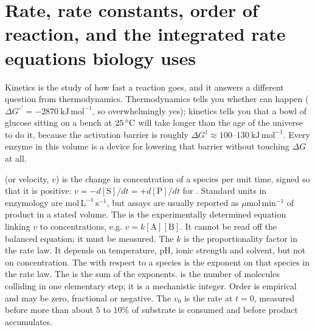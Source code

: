 
\section{Rate, rate constants, order of reaction, and the integrated rate equations biology uses}

Kinetics is the study of how fast a reaction goes, and it answers a different question
from thermodynamics. Thermodynamics tells you whether 
can happen ($\Delta G^{\circ\prime} = -2870\ \mathrm{kJ\,mol^{-1}}$, so overwhelmingly yes);
kinetics tells you that a bowl of glucose sitting on a bench at $25\,^{\circ}\mathrm{C}$ will take
longer than the age of the universe to do it, because the activation barrier is roughly
$\Delta G^{\ddagger} \approx 100\text{--}130\ \mathrm{kJ\,mol^{-1}}$. Every enzyme in
this volume is a device for lowering that barrier without touching $\Delta G$ at all.

\begin{defbox}[title={DEFINITIONS: the vocabulary of rate}]
 (or velocity, $v$) is the change in concentration of a species per unit time,
signed so that it is positive: $v=-d[\mathrm{S}]/dt=+d[\mathrm{P}]/dt$ for
. Standard units in enzymology are
$\mathrm{mol\,L^{-1}\,s^{-1}}$, but assays are usually reported as
$\mu\mathrm{mol\,min^{-1}}$ of product in a stated volume.
The  is the experimentally determined equation linking $v$ to
concentrations, e.g. $v=k[\mathrm{A}][\mathrm{B}]$. It cannot be read off the balanced
equation; it must be measured.
The  $k$ is the proportionality factor in the rate law. It depends on
temperature, pH, ionic strength and solvent, but not on concentration.
The  with respect to a species is the exponent on that species in the rate
law. The  is the sum of the exponents.
 is the number of molecules colliding in one elementary step; it is a
mechanistic integer. Order is empirical and may be zero, fractional or negative.
The  $v_0$ is the rate at $t=0$, measured before more than about
$5$ to $10\%$ of substrate is consumed and before product accumulates.
\end{defbox}

